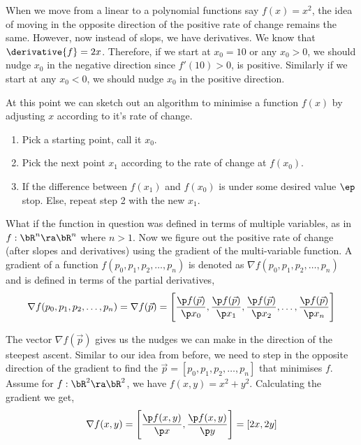 \documentclass{homework}
\begin{document}

When we move from a linear to a polynomial functions say $f(x) = x^2$, the idea of moving in the opposite direction of the positive rate of change remains the same. However, now instead of slops, we have derivatives. We know that $\derivative{f} = 2x$. Therefore, if we start at $x_0=10$ or any $x_0 > 0$, we should nudge $x_0$ in the negative direction since $f'(10) > 0$, is positive. Similarly if we start at any $x_0 < 0$, we should nudge $x_0$ in the positive direction.


At this point we can sketch out an algorithm to minimise a function $f(x)$ by adjusting $x$ according to it's rate of change.

\begin{enumerate}
  \item Pick a starting point, call it $x_0$.
  \item Pick the next point $x_1$ according to the rate of change at $f(x_0)$.
  \item If the difference between $f(x_1)$ and $f(x_0)$ is under some desired value $\ep$ stop. Else, repeat step 2 with the new $x_1$.
\end{enumerate}

What if the function in question was defined in terms of multiple variables, as in $f: \bR^n \ra \bR^n$ where $n > 1$. Now we figure out the positive rate of change (after slopes and derivatives) using the gradient of the multi-variable function. A gradient of a function $f(p_0, p_1, p_2, \hdots, p_n)$ is denoted as $\nabla f(p_0, p_1, p_2, \hdots, p_n)$ and is defined in terms of the partial derivatives,
\[
  \nabla f(p_0, p_1, p_2, \hdots, p_n)
  = \nabla f(\vec{p})
  = \Bigg[\frac{\p f(\vec{p})}{\p x_0}, \frac{\p f(\vec{p})}{\p x_1}, \frac{\p f(\vec{p})}{\p x_2}, \hdots, \frac{\p f(\vec{p})}{\p x_n}\Bigg]
\]

The vector $\nabla f(\vec{p})$ gives us the nudges we can make in the direction of the steepest ascent. Similar to our idea from before, we need to step in the opposite direction of the gradient to find the $\vec{p} = [p_0, p_1, p_2, \hdots, p_n]$ that minimises $f$. Assume for $f: \bR^2 \ra \bR^2$, we have $f(x, y) = x^2 + y^2$. Calculating the gradient we get,
\[
  \nabla f(x, y) = \Bigg[\frac{\p f(x,y)}{\p x}, \frac{\p f(x,y)}{\p y}\Bigg] = [2x, 2y]
\]
\end{document}
